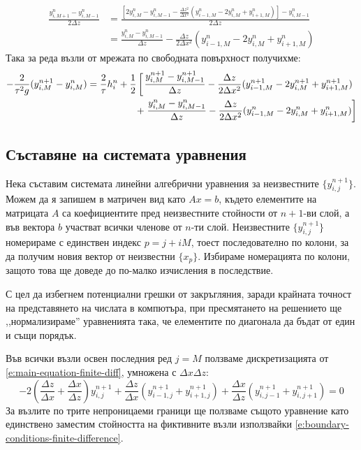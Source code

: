 \documentclass[12pt]{article}
\numberwithin{equation}{section}
\begin{document}
\begin{equation}
    \begin{aligned}
        \frac{y^n_{i,M+1} - y^n_{i,M-1}}{2\Delta z}
        &= \frac{\left[ 2y^n_{i,M} - y^n_{i,M-1} - \frac{\Delta z^2}{\Delta x^2} (y^n_{i-1,M} - 2y^n_{i,M} + y^n_{i+1,M}) \right] - y^n_{i,M-1}}{2\Delta z} \\
        &= \frac{y^n_{i,M} - y^n_{i,M-1}}{\Delta z} - \frac{\Delta z}{2 \Delta x^2}(y^n_{i-1,M} - 2y^n_{i,M} + y^n_{i+1,M})
    \end{aligned}
\end{equation}
Така за реда възли от мрежата по свободната повърхност получихме:
\begin{equation}
    \label{e:top-row-finite-difference}
    \begin{aligned}
        - \frac{2}{\tau^2 g}(y^{n+1}_{i,M} - y^n_{i,M})
        = \frac{2}{\tau}h^n_i
        + \frac{1}{2} \left[ \vphantom{\frac{y^n_i}{\Delta z}} \right. &\frac{y^{n+1}_{i,M} - y^{n+1}_{i,M-1}}{\Delta z} - \frac{\Delta z}{2 \Delta x^2}(y^{n+1}_{i-1,M} - 2y^{n+1}_{i,M} + y^{n+1}_{i+1,M}) \\
        + & \left. \frac{y^n_{i,M} - y^n_{i,M-1}}{\Delta z} - \frac{\Delta z}{2 \Delta x^2}(y^n_{i-1,M} - 2y^n_{i,M} + y^n_{i+1,M}) \right]
    \end{aligned}
\end{equation}

\subsection{Съставяне на системата уравнения}
Нека съставим системата линейни алгебрични уравнения за неизвестните $\{y^{n+1}_{i,j}\}$. Можем да я запишем в матричен вид като $Ax=b$, където елементите на матрицата $A$ са коефициентите пред неизвестните стойности от $n+1$-ви слой, а във вектора $b$ участват всички членове от $n$-ти слой. Неизвестните $\{y^{n+1}_{i,j}\}$ номерираме с единствен индекс $p=j + iM$, тоест последователно по колони, за да получим новия вектор от неизвестни $\{x_p\}$. Избираме номерацията по колони, защото това ще доведе до по-малко изчисления в последствие.

С цел да избегнем потенциални грешки от закръгляния, заради крайната точност на представянето на числата в компютъра, при пресмятането на решението ще ,,нормализираме'' уравненията така, че елементите по диагонала да бъдат от един и същи порядък.

Във всички възли освен последния ред $j=M$ ползваме дискретизацията от \autoref{e:main-equation-finite-diff}, умножена с $\Delta x \Delta z$:
\begin{equation}
    - 2 \left( \frac{\Delta z}{\Delta x} + \frac{\Delta x}{\Delta z} \right) y^{n+1}_{i,j}
    + \frac{\Delta z}{\Delta x} (y^{n+1}_{i-1,j} + y^{n+1}_{i+1,j})
    + \frac{\Delta x}{\Delta z} (y^{n+1}_{i,j-1} + y^{n+1}_{i,j+1})
    = 0
\end{equation}
За възлите по трите непроницаеми граници ще ползваме същото уравнение като единствено заместим стойността на фиктивните възли използвайки \autoref{e:boundary-conditions-finite-difference}.
\end{document}
